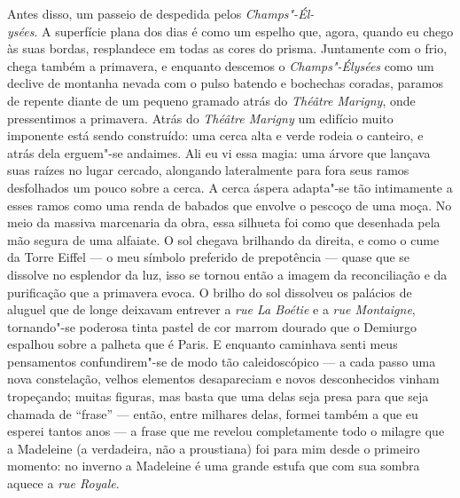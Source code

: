 Antes disso, um passeio de despedida pelos \emph{Champs"-Él-\\ysées}. A superfície
plana dos dias é como um espelho que, agora, quando eu chego às suas
bordas, resplandece em todas as cores do prisma. Juntamente com o frio,
chega também a primavera, e enquanto descemos o \emph{Champs"-Élysées} como um
declive de montanha nevada com o pulso batendo e bochechas coradas,
paramos de repente diante de um pequeno gramado atrás do \emph{Théâtre
Marigny}, onde pressentimos a primavera. Atrás do \emph{Théâtre Marigny} um edifício
muito imponente está sendo construído: uma cerca alta e verde rodeia o canteiro,
e atrás dela erguem"-se andaimes. Ali eu vi essa magia: uma árvore que
lançava suas raízes no lugar cercado, alongando lateralmente para fora
seus ramos desfolhados um pouco sobre a cerca. A cerca áspera adapta"-se tão intimamente a esses ramos como uma renda de babados que envolve o pescoço de uma moça. No meio da massiva marcenaria da obra, essa silhueta foi como que desenhada pela mão segura de uma alfaiate. O sol chegava
brilhando da direita, e como o cume da Torre Eiffel --- o meu símbolo
preferido de prepotência --- quase que se dissolve no esplendor da luz, isso se tornou então a imagem da reconciliação e da purificação que a primavera evoca. O brilho do sol dissolveu os palácios de aluguel que de longe
deixavam entrever a \emph{rue La Boétie} e a \emph{rue Montaigne},
tornando"-se poderosa tinta pastel de cor marrom dourado que o Demiurgo
espalhou sobre a palheta que é Paris. E enquanto caminhava senti meus
pensamentos confundirem"-se de modo tão caleidoscópico --- a cada passo
uma nova constelação, velhos elementos desapareciam e novos
desconhecidos vinham tropeçando; muitas figuras, mas basta que uma delas seja presa para que seja chamada de ``frase'' --- então, entre milhares
delas, formei também a que eu esperei tantos anos --- a frase que
me revelou completamente todo o milagre que a Madeleine (a verdadeira, não
a proustiana) foi para mim desde o primeiro momento: no inverno a
Madeleine é uma grande estufa que com sua sombra aquece a \emph{rue
Royale}.
